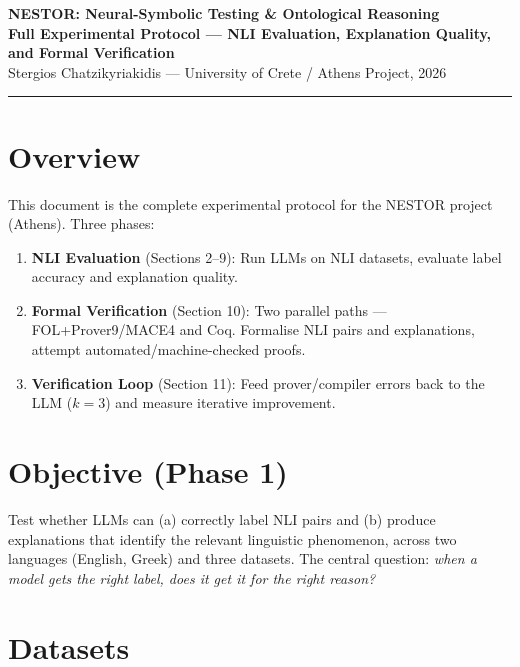 \documentclass[11pt,a4paper]{article}
\begin{document}
\begin{center}
{\large\bfseries NESTOR: Neural-Symbolic Testing \& Ontological Reasoning\\Full Experimental Protocol --- NLI Evaluation, Explanation Quality, and Formal Verification}\\[4pt]
{\small\color{gray} Stergios Chatzikyriakidis --- University of Crete / Athens Project, 2026}\\[2pt]
\textcolor{uocgreen}{\rule{\textwidth}{0.5pt}}
\end{center}

\section{Overview}

This document is the complete experimental protocol for the NESTOR project (Athens). Three phases:

\begin{enumerate}[nosep,leftmargin=1.5em]
\item \textbf{NLI Evaluation} (Sections 2--9): Run LLMs on NLI datasets, evaluate label accuracy and explanation quality.
\item \textbf{Formal Verification} (Section 10): Two parallel paths --- FOL+Prover9/MACE4 and Coq. Formalise NLI pairs and explanations, attempt automated/machine-checked proofs.
\item \textbf{Verification Loop} (Section 11): Feed prover/compiler errors back to the LLM ($k{=}3$) and measure iterative improvement.
\end{enumerate}

\section{Objective (Phase 1)}

Test whether LLMs can (a) correctly label NLI pairs and (b) produce explanations that identify the relevant linguistic phenomenon, across two languages (English, Greek) and three datasets. The central question: \emph{when a model gets the right label, does it get it for the right reason?}

\section{Datasets}
\end{document}
